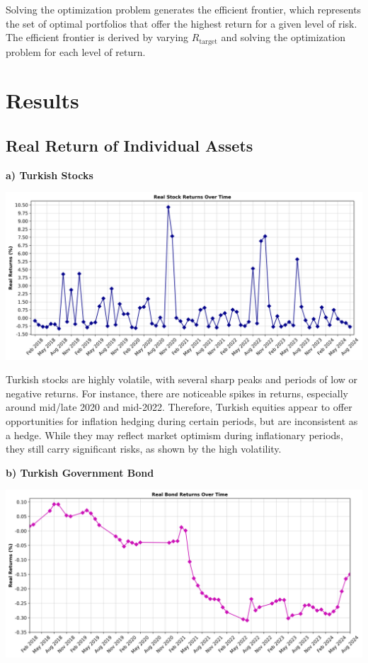 \documentclass[
]{article}
\begin{document}
Solving the optimization problem generates the efficient frontier, which
represents the set of optimal portfolios that offer the highest return
for a given level of risk. The efficient frontier is derived by varying
\(R_{\text{target}}\) and solving the optimization problem for each
level of return.

\section{Results}\label{results}
\subsection{Real Return of Individual Assets}
\textbf{a) Turkish Stocks}

\includegraphics[width=\textwidth]{real_stock_returns.png}

Turkish stocks are highly volatile, with several sharp peaks and periods of low or negative returns. For instance, there are noticeable spikes in returns, especially around mid/late 2020 and mid-2022. Therefore, Turkish equities appear to offer opportunities for inflation hedging during certain periods, but are inconsistent as a hedge. While they may reflect market optimism during inflationary periods, they still carry significant risks, as shown by the high volatility.

\textbf{b) Turkish Government Bond}

\includegraphics[width=\textwidth]{real_bond_returns.png}
\end{document}
